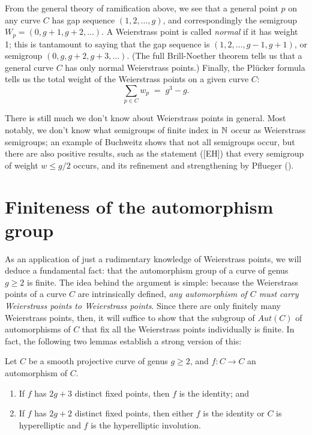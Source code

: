 From the general theory of ramification above, we see that a general point $p$ on any curve $C$ has gap sequence $(1,2,\dots,g)$, and correspondingly the semigroup $W_p = (0, g+1, g+2, \dots)$. A Weierstrass point is called \emph{normal} if it has weight 1; this is tantamount to saying that the gap sequence is $(1,2,\dots,g-1,g+1)$, or semigroup $(0, g, g+2, g+3, \dots)$. (The full Brill-Noether theorem tells us that a general curve $C$ has only normal Weierstrass points.) Finally, the Pl\"ucker formula tells us  the total weight of the Weierstrass points on a given curve $C$:
$$
\sum_{p \in C} w_p \; = \; g^3-g.
$$

There is still much we don't know about Weierstrass points in general. Most notably, we don't know what semigroups of finite index in $\NN$ occur as Weierstrass semigroups; an example of Buchweitz shows that not all semigroups occur, but there are also positive results, such as the statement ([EH]) that every semigroup of weight $w \leq g/2$ occurs, and its refinement and strengthening by Pflueger (\cite{**}).

\section{Finiteness of the automorphism group}

As an application of just a rudimentary knowledge of Weierstrass points, we will deduce a fundamental fact: that the automorphism group of a curve of genus $g\geq 2$ is finite. The idea behind the argument is simple: because the Weierstrass points of a curve $C$ are intrinsically defined, \emph{any automorphism of $C$ must carry Weierstrass points to Weierstrass points}. Since there are only finitely many Weierstrass points, then, it will suffice to show that the subgroup of $Aut(C)$ of automorphisms of $C$ that fix all the Weierstrass points individually is finite. In fact, the following two lemmas establish a strong version of this:

\begin{lemma}
Let $C$ be a smooth projective curve of genus $g \geq 2$, and $f: C \to C$ an automorphism of $C$.
\begin{enumerate}
\item If $f$ has $2g+3$ distinct fixed points, then $f$ is the identity; and
\item If $f$ has $2g+2$ distinct fixed points, then either $f$ is the identity or $C$ is hyperelliptic and $f$ is the hyperelliptic involution.
\end{enumerate}
\end{lemma}

